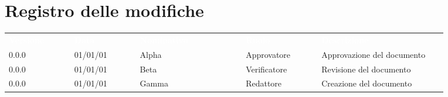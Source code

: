 \section*{Registro delle modifiche}

{\renewcommand{\arraystretch}{1.5}
\begin{tabular}{p{0.13\linewidth}p{0.13\linewidth}p{0.21\linewidth}p{0.15\linewidth}p{0.25\linewidth}}
	\rowcolor[RGB]{33, 73, 50}
	\textcolor{white}{\textbf{Versione}} & \textcolor{white}{\textbf{Data}} & \textcolor{white}
	{\textbf{Nominativo}} & \textcolor{white}{\textbf{Ruolo}} & \textcolor{white}
	{\textbf{Descrizione}}\\
	\rowcolor[RGB]{216, 235, 171}
	0.0.0 & 01/01/01 & Alpha & Approvatore & Approvazione del documento\\
	\rowcolor[RGB]{233, 245, 206}
	0.0.0 & 01/01/01 & Beta & Verificatore & Revisione del documento\\
	\rowcolor[RGB]{216, 235, 171}
	0.0.0 & 01/01/01 & Gamma & Redattore & Creazione del documento\\
	
\end{tabular}	
}